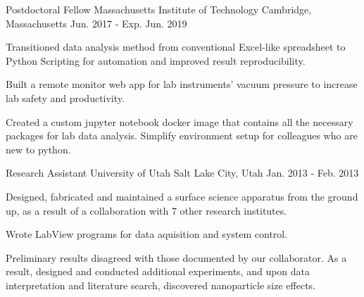 


\begin{cventries}


\cventry
{Postdoctoral Fellow}
{Massachusetts Institute of Technology}
{Cambridge, Massachusetts}
{Jun. 2017 - Exp. Jun. 2019}
{
\begin{cvitems}
\item {Transitioned data analysis method from conventional Excel-like
    spreadsheet to Python Scripting for automation and improved result
    reproducibility.}
\item {Built a remote monitor web app for lab instruments' vacuum pressure to
    increase lab safety and productivity.}
\item {Created a custom jupyter notebook docker image that contains all the
    necessary packages for lab data analysis. Simplify environment setup for
    colleagues who are new to python.}
\end{cvitems}
}


\cventry
{Research Assistant}
{University of Utah}
{Salt Lake City, Utah}
{Jan. 2013 - Feb. 2013}
{
\begin{cvitems}
\item {Designed, fabricated and maintained a surface science apparatus from the
    ground up, as a result of a collaboration with 7 other research institutes.}
\item {Wrote LabView programs for data aquisition and system control.}
\item {Preliminary results disagreed with those documented by our collaborator.
    As a result, designed and conducted additional experiments, and
    upon data interpretation and literature search, discovered nanoparticle size
    effects.}
\end{cvitems}
}


\end{cventries}